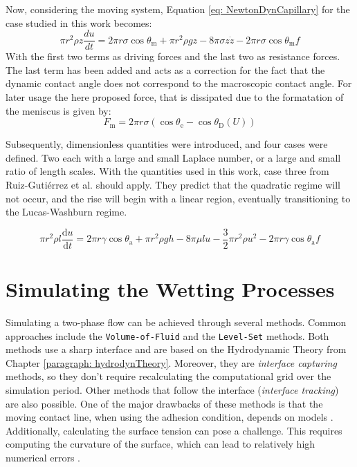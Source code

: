 Now, considering the moving system, Equation \ref{eq: NewtonDynCapillary} for the case studied in this work becomes:
\begin{equation}
    \pi r^{2}\rho z \frac{du}{dt}= 2\pi r\sigma \cos\theta_{\mathrm{m}}+\pi r^{2}\rho gz-8\pi \sigma z \dot{z} -2\pi r \sigma \cos \theta_{\mathrm{m}}f
\end{equation}
With the first two terms as driving forces and the last two as resistance forces. The last term has been added and acts as a correction for the fact that the dynamic contact angle does not correspond to the macroscopic contact angle. 
For later usage the here proposed force, that is dissipated due to the formatation of the meniscus is given by:
\begin{equation}
    \label{eq: meniscusFormation}
    F_{\mathrm{m}} = 2\pi r \sigma (\cos \theta_{\mathrm{e}}-\cos \theta_{\mathrm{D}}(U))
\end{equation}

Subsequently, dimensionless quantities were introduced, and four cases were defined. Two each with a large and small Laplace number, or a large and small ratio of length scales. With the quantities used in this work, case three from Ruiz-Gutiérrez et al. \cite{ruiz-gutierrez2022LongCrossoverDynamics} should apply. They predict that the quadratic regime will not occur, and the rise will begin with a linear region, eventually transitioning to the Lucas-Washburn regime.


\begin{equation}
    \pi r^2\rho l\frac{\mathrm{d}u}{\mathrm{d}t}=2\pi r\gamma\cos\theta_{\mathrm{a}}+\pi r^2\rho gh-8\pi\mu lu-\frac{3}{2}\pi r^2\rho u^2-2\pi r\gamma\cos\theta_{\mathrm{a}}f
\end{equation}


\section{Simulating the Wetting Processes}
Simulating a two-phase flow can be achieved through several methods. Common approaches include the \texttt{Volume-of-Fluid} and the \texttt{Level-Set} methods. Both methods use a sharp interface and are based on the Hydrodynamic Theory from Chapter \ref{paragraph: hydrodynTheory}. Moreover, they are \textit{interface capturing} methods, so they don't require recalculating the computational grid over the simulation period. Other methods that follow the interface (\textit{interface tracking}) are also possible. One of the major drawbacks of these methods is that the moving contact line, when using the adhesion condition, depends on models \cite{carlsonCapillarityDynamicWetting2012}. Additionally, calculating the surface tension can pose a challenge. This requires computing the curvature of the surface, which can lead to relatively high numerical errors \cite{jamshidi2019SuitabilityPhasefieldAlgebraic,hagg2019DirekteNumerischeSimulation}.

